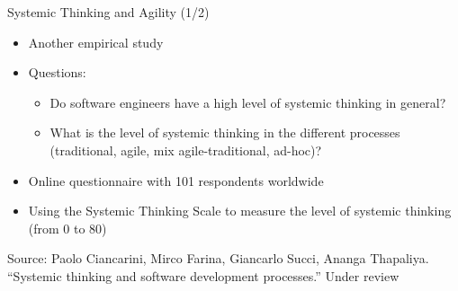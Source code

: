 \documentclass{beamer}
\begin{document}
\begin{frame}
{\centerline{Systemic Thinking and Agility (1/2)}}

\begin{itemize}
\item Another empirical study
\item Questions: 
\begin{itemize} 
\item Do software engineers have a high level
of systemic thinking in general?
\item What is the level of systemic thinking in the different processes (traditional, agile, mix agile-traditional, ad-hoc)?
\end{itemize}
\item Online questionnaire with 101 respondents worldwide 
\item Using the Systemic Thinking Scale to measure the level of systemic thinking (from 0 to 80)
\end{itemize}

\begin{center}
    \tiny{Source: Paolo Ciancarini, Mirco Farina, Giancarlo Succi, Ananga Thapaliya. ``Systemic thinking and software development processes.'' Under review}
\end{center}

\end{frame}
\end{document}
